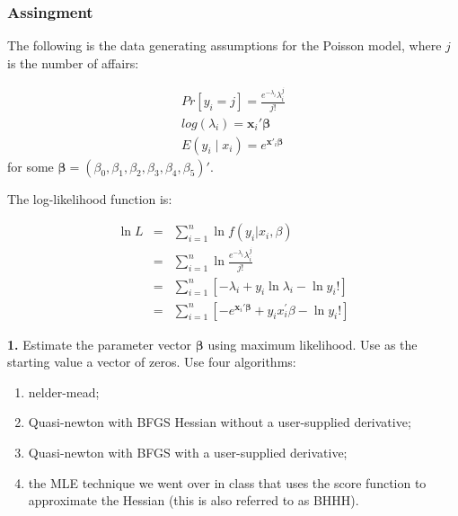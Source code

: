 \documentclass[10pt]{article}
\newcommand{\bs}{\boldsymbol}
\begin{document}
\subsubsection*{Assingment} %
\label{ssub:assingment}

 The following is the data generating assumptions for the Poisson model, where $j$ is the number of affairs:

 \begin{align}
 	Pr[y_i=j] = \frac{e^{-\lambda_i}\lambda_i^j}{j!}\\
 	log(\lambda_i) = \bs{x}_i'\bs{\beta} \\
 	E(y_i\mid x_i) = e^{\bs{x}'_i\bs{\beta}}
 \end{align}
 for some $\bs{\beta} = (\beta_0,\beta_1,\beta_2,\beta_3,\beta_4,\beta_5)'$.

 The log-likelihood function is: 

\begin{eqnarray*}
\ln L &=&\sum\limits_{i=1}^{n}\ln f\left( y_{i}\left\vert x_{i}\right.
,\beta \right) \\
&=&\sum\limits_{i=1}^{n}\ln \frac{e^{-\lambda _{i}}\lambda _{i}^{j}}{j!} \\
&=&\sum\limits_{i=1}^{n}\left[ -\lambda _{i}+y_{i}\ln \lambda _{i}-\ln y_i!%
\right] \\
&=&\sum\limits_{i=1}^{n}\left[ -e^{\mathbf{x}_{i}\prime \mathbf{\beta }%
}+y_{i}x_{i}^{\prime }\beta -\ln y_{i}!\right]
\end{eqnarray*}




\noindent \textbf{1.} Estimate the parameter vector $\bs{\beta}$ using maximum likelihood. Use as the starting value a vector of zeros. Use four algorithms:
\begin{enumerate}
	\item nelder-mead;
	\item Quasi-newton with BFGS Hessian without a user-supplied derivative;
	\item Quasi-newton with BFGS with a user-supplied derivative;
	\item the MLE technique we went over in class that uses the score function to approximate the Hessian (this is also referred to as BHHH).
\end{enumerate}
\end{document}
